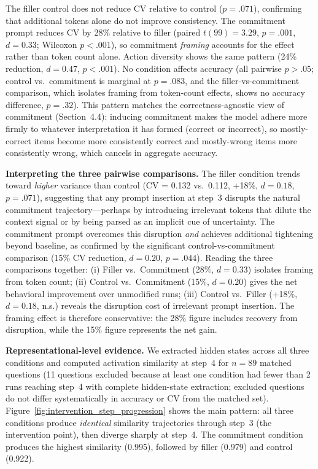 \documentclass{article}
\begin{document}
The filler control does not reduce CV relative to control ($p = .071$), confirming that additional tokens alone do not improve consistency. The commitment prompt reduces CV by 28\% relative to filler (paired $t(99) = 3.29$, $p = .001$, $d = 0.33$; Wilcoxon $p < .001$), so commitment \emph{framing} accounts for the effect rather than token count alone. Action diversity shows the same pattern (24\% reduction, $d = 0.47$, $p < .001$). No condition affects accuracy (all pairwise $p > .05$; control vs.\ commitment is marginal at $p = .083$, and the filler-vs-commitment comparison, which isolates framing from token-count effects, shows no accuracy difference, $p = .32$). This pattern matches the correctness-agnostic view of commitment (Section~4.4): inducing commitment makes the model adhere more firmly to whatever interpretation it has formed (correct or incorrect), so mostly-correct items become more consistently correct and mostly-wrong items more consistently wrong, which cancels in aggregate accuracy.

\textbf{Interpreting the three pairwise comparisons.} The filler condition trends toward \emph{higher} variance than control (CV = 0.132 vs.\ 0.112, +18\%, $d = 0.18$, $p = .071$), suggesting that any prompt insertion at step~3 disrupts the natural commitment trajectory---perhaps by introducing irrelevant tokens that dilute the context signal or by being parsed as an implicit cue of uncertainty. The commitment prompt overcomes this disruption \emph{and} achieves additional tightening beyond baseline, as confirmed by the significant control-vs-commitment comparison (15\% CV reduction, $d = 0.20$, $p = .044$). Reading the three comparisons together: (i) Filler vs.\ Commitment (28\%, $d = 0.33$) isolates framing from token count; (ii) Control vs.\ Commitment (15\%, $d = 0.20$) gives the net behavioral improvement over unmodified runs; (iii) Control vs.\ Filler (+18\%, $d = 0.18$, n.s.) reveals the disruption cost of irrelevant prompt insertion. The framing effect is therefore conservative: the 28\% figure includes recovery from disruption, while the 15\% figure represents the net gain.

\textbf{Representational-level evidence.} We extracted hidden states across all three conditions and computed activation similarity at step~4 for $n{=}89$ matched questions (11 questions excluded because at least one condition had fewer than 2 runs reaching step~4 with complete hidden-state extraction; excluded questions do not differ systematically in accuracy or CV from the matched set). Figure~\ref{fig:intervention_step_progression} shows the main pattern: all three conditions produce \emph{identical} similarity trajectories through step~3 (the intervention point), then diverge sharply at step~4. The commitment condition produces the highest similarity (0.995), followed by filler (0.979) and control (0.922).
\end{document}
